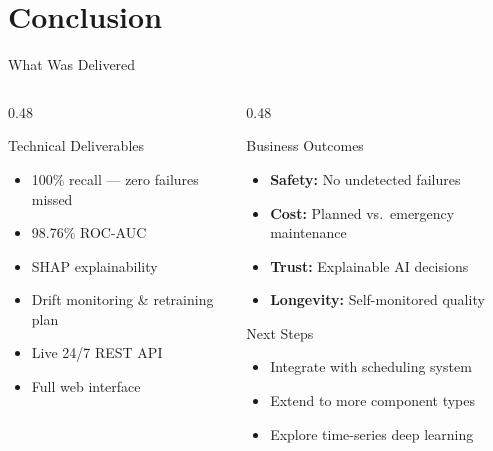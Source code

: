 \documentclass[aspectratio=169]{beamer}
\begin{document}
\section{Conclusion}

\begin{frame}{What Was Delivered}

  \begin{columns}[T]
    \begin{column}{0.48\textwidth}
      \begin{exampleblock}{Technical Deliverables}
        \begin{itemize}
          \item[\textcolor{safegreen}{\checkmark}] 100\% recall --- zero failures missed
          \item[\textcolor{safegreen}{\checkmark}] 98.76\% ROC-AUC
          \item[\textcolor{safegreen}{\checkmark}] SHAP explainability
          \item[\textcolor{safegreen}{\checkmark}] Drift monitoring \& retraining plan
          \item[\textcolor{safegreen}{\checkmark}] Live 24/7 REST API
          \item[\textcolor{safegreen}{\checkmark}] Full web interface
        \end{itemize}
      \end{exampleblock}
    \end{column}

    \begin{column}{0.48\textwidth}
      \begin{block}{Business Outcomes}
        \begin{itemize}
          \item \textbf{Safety:} No undetected failures
          \item \textbf{Cost:} Planned vs.\ emergency maintenance
          \item \textbf{Trust:} Explainable AI decisions
          \item \textbf{Longevity:} Self-monitored quality
        \end{itemize}
      \end{block}

      \vspace{0.3cm}

      \begin{alertblock}{Next Steps}
        \begin{itemize}
          \item Integrate with scheduling system
          \item Extend to more component types
          \item Explore time-series deep learning
        \end{itemize}
      \end{alertblock}
    \end{column}
  \end{columns}

\end{frame}
\end{document}
